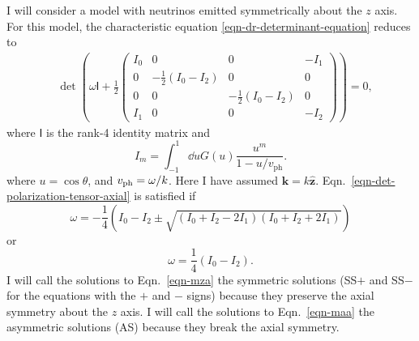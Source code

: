 I will consider a model with neutrinos emitted symmetrically about the $z$ axis. For this model, the characteristic equation \eqref{eqn-dr-determinant-equation} reduces to
\begin{align}
&\det \left( \omega \mathsf{I} + \frac{1}{2}
\begin{pmatrix}
   I_0 & 0 & 0 & -I_1 \\
   0 & -\frac{1}{2} (I_0 - I_2) & 0 & 0 \\
   0 & 0 & -\frac{1}{2} (I_0 - I_2) & 0 \\
   I_1 & 0 & 0 & -I_2
\end{pmatrix}\right) =0,
\label{eqn-det-polarization-tensor-axial}
\end{align}
where $\mathsf I$ is the rank-4 identity matrix and
\begin{equation}
   I_m =\int_{-1}^{1} \dd u G(u) \frac{u^m}{1 -  u/v_{\mathrm{ph}} }.
\end{equation}
where $u=\cos\theta$, and $v_{\mathrm{ph}}=\omega/k$. Here I have assumed $\mathbf k = k \hat{\mathbf z}$. %
Eqn.~\eqref{eqn-det-polarization-tensor-axial} is satisfied if
\begin{equation}
    \omega  = - \frac{1}{4} \left( I_0 - I_2 \pm \sqrt{ (I_0 + I_2 - 2 I_1) (I_0 + I_2 + 2 I_1) } \right)
    \label{eqn-mza}
\end{equation}
or
\begin{equation}
   \omega = \frac{1}{4}(I_0 - I_2).
   \label{eqn-maa}
\end{equation}
I will call the solutions to Eqn.~\eqref{eqn-mza} the symmetric solutions (SS$+$ and SS$-$ for the equations with the $+$ and $-$ signs) because they preserve the axial symmetry about the $z$ axis. I will call the solutions to Eqn.~\eqref{eqn-maa} the asymmetric solutions (AS) because they break the axial symmetry.




